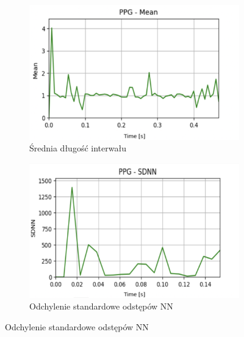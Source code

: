 \documentclass[journal]{IEEEtran}
\begin{document}
{\begin{figure}[h]
    \centering
    \begin{subfigure}{0.47\textwidth}
        \centering
        \includegraphics[width=\linewidth]{Mean.png}
        \caption{Średnia długość interwału}
    \end{subfigure}
    
   \vspace{0.2cm} 
    \begin{subfigure}{0.47\textwidth}
        \centering
        \includegraphics[width=\linewidth]{SDNN.png}
        \caption{Odchylenie standardowe odstępów NN}
    \end{subfigure}
    

\end{figure}}
\end{document}
